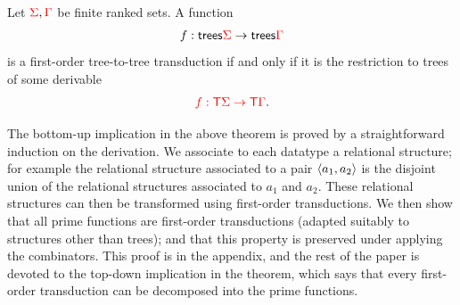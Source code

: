 




\begin{theorem}\label{thm:main}
    Let ${\color{red}{\Sigma}},{\color{red}{\Gamma}}$ be finite ranked sets. A function 
    \begin{align*}
        f : \mathsf {trees} {\color{red}{\Sigma}} \to \mathsf {trees} {\color{red}{\Gamma}}
    \end{align*}
    is a first-order tree-to-tree transduction if and only if it is the restriction to trees of some derivable
    \begin{align*}
        {\color{red}{f : {\color{red}{\mathsf T}}\Sigma \to {\color{red}{\mathsf T}}\Gamma}}.
    \end{align*}
    
\end{theorem}

The bottom-up implication in the above theorem is proved by a straightforward induction on the derivation. We associate to each datatype a relational structure; for example the relational structure associated to a pair $\langle{a_1,a_2}\rangle$ is the disjoint union of the relational structures associated to $a_1$ and $a_2$. These relational structures can then be transformed using first-order transductions.   We then show that all prime functions are first-order transductions (adapted suitably to structures other than trees); and that this property is preserved under applying the combinators.  This proof is in the appendix, and the rest of the paper is devoted to the top-down implication in the theorem, which says that every first-order transduction can be decomposed into the prime functions.


